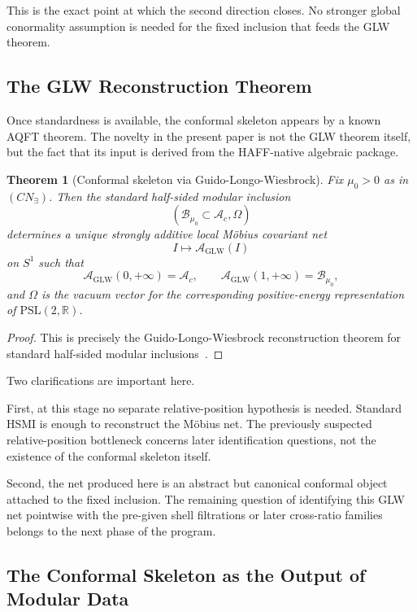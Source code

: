 \documentclass[12pt]{article}
\newtheorem{theorem}{Theorem}[section]
\theoremstyle{definition}
\theoremstyle{remark}
\begin{document}
This is the exact point at which the second direction closes. No
stronger global conormality assumption is needed for the fixed inclusion
that feeds the GLW theorem.

\subsection{The GLW Reconstruction
Theorem}\label{the-glw-reconstruction-theorem}

Once standardness is available, the conformal skeleton appears by a
known AQFT theorem. The novelty in the present paper is not the GLW
theorem itself, but the fact that its input is derived from the
HAFF-native algebraic package.

\begin{theorem}[Conformal skeleton via Guido-Longo-Wiesbrock]\label{thm:4.7}
Fix \(\mu_0>0\) as in \((CN_\exists)\). Then the standard half-sided
modular inclusion \[
(\mathcal{B}_{\mu_0}\subset \mathcal{A}_c,\Omega)
\] determines a unique strongly additive local Möbius covariant net \[
I\longmapsto \mathcal{A}_{\mathrm{GLW}}(I)
\] on \(S^1\) such that \[
\mathcal{A}_{\mathrm{GLW}}(0,+\infty)=\mathcal{A}_c,
\qquad
\mathcal{A}_{\mathrm{GLW}}(1,+\infty)=\mathcal{B}_{\mu_0},
\] and \(\Omega\) is the vacuum vector for the corresponding
positive-energy representation of \(\mathrm{PSL}(2,\mathbb{R})\).
\end{theorem}

\begin{proof}
This is precisely the Guido-Longo-Wiesbrock reconstruction theorem for
standard half-sided modular inclusions~\cite{GLW1998}.
\end{proof}

Two clarifications are important here.

First, at this stage no separate relative-position hypothesis is needed.
Standard HSMI is enough to reconstruct the Möbius net. The previously
suspected relative-position bottleneck concerns later identification
questions, not the existence of the conformal skeleton itself.

Second, the net produced here is an abstract but canonical conformal
object attached to the fixed inclusion. The remaining question of
identifying this GLW net pointwise with the pre-given shell filtrations
or later cross-ratio families belongs to the next phase of the program.

\subsection{The Conformal Skeleton as the Output of Modular
Data}\label{the-conformal-skeleton-as-the-output-of-modular-data}
\end{document}
